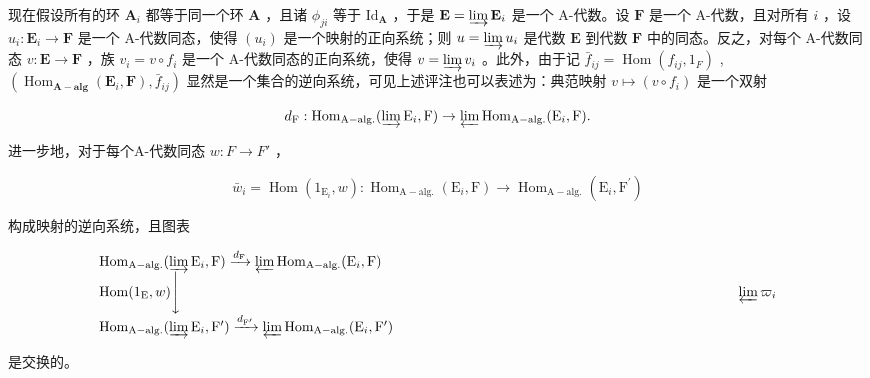 现在假设所有的环 \(\mathbf{A}_i\) 都等于同一个环 \(\mathbf{A}\) ，且诸 \(\phi_{ji}\) 等于 \(\mathrm{Id}_{\mathbf{A}}\) ，于是 \(\mathbf{E} = \varinjlim \mathbf{E}_i\) 是一个 A-代数。设 \(\mathbf{F}\) 是一个 A-代数，且对所有 \(i\) ，设 \(u_i: \mathbf{E}_i \to \mathbf{F}\) 是一个 A-代数同态，使得 \((u_i)\) 是一个映射的正向系统；则 \(u = \varinjlim u_i\) 是代数 \(\mathbf{E}\) 到代数 \(\mathbf{F}\) 中的同态。反之，对每个 A-代数同态 \(v: \mathbf{E} \to \mathbf{F}\) ，族 \(v_i = v \circ f_i\) 是一个 A-代数同态的正向系统，使得 \(v = \varinjlim v_i\) 。此外，由于记 \(\bar{f}_{ij} = \operatorname{Hom}(f_{ij}, 1_F)\) , \((\operatorname{Hom}_{\mathbf{A-alg}}(\mathbf{E}_i, \mathbf{F}), \bar{f}_{ij})\) 显然是一个集合的逆向系统，可见上述评注也可以表述为：典范映射 \(v \mapsto (v \circ f_i)\) 是一个双射

\[
d _ {\mathrm{F}}: \operatorname{Hom} _ {\mathrm{A-alg.}} (\varinjlim \mathrm{E} _ {i}, \mathrm{F}) \rightarrow \varprojlim \operatorname{Hom} _ {\mathrm{A-alg.}} (\mathrm{E} _ {i}, \mathrm{F}).
\]

进一步地，对于每个A-代数同态 \(w: F \rightarrow F'\) ，

\[
\bar {w} _ {i} = \operatorname{Hom} (1 _ {\mathrm{E} _ {i}}, w): \operatorname{Hom} _ {\mathrm{A-alg.}} (\mathrm{E} _ {i}, \mathrm{F}) \rightarrow \operatorname{Hom} _ {\mathrm{A-alg.}} (\mathrm{E} _ {i}, \mathrm{F} ^ {\prime})
\]

构成映射的逆向系统，且图表

\[
\begin{array}{l} \operatorname{Hom} _ {\mathrm{A-alg.}} (\varinjlim \mathrm{E} _ {i}, \mathrm{F}) \xrightarrow {d _ {\mathrm{F}}} \varprojlim \operatorname{Hom} _ {\mathrm{A-alg.}} (\mathrm{E} _ {i}, \mathrm{F}) \\ \operatorname{Hom} (1 _ {\mathrm{E}}, w) \Biggl \downarrow \qquad \qquad \qquad \qquad \qquad \qquad \qquad \qquad \qquad \qquad \qquad \qquad \qquad \qquad \qquad \qquad \qquad \qquad \qquad \qquad \varprojlim \varpi_ {i} \\ \operatorname{Hom} _ {\mathrm{A-alg.}} (\varinjlim \mathrm{E} _ {i}, \mathrm{F} ^ {\prime}) \xrightarrow {d _ {\mathrm{F} ^ {\prime}}} \varprojlim \operatorname{Hom} _ {\mathrm{A-alg.}} (\mathrm{E} _ {i}, \mathrm{F} ^ {\prime}) \end{array}
\]

是交换的。

